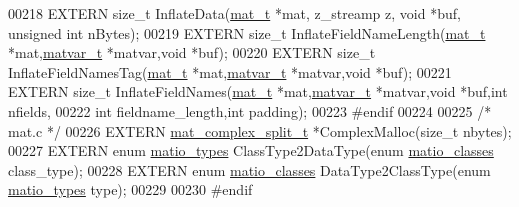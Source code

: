 \begin{DoxyCode}
00218 EXTERN \textcolor{keywordtype}{size\_t} InflateData(\hyperlink{struct__mat__t}{mat\_t} *mat, z\_streamp z, \textcolor{keywordtype}{void} *buf, \textcolor{keywordtype}{unsigned} \textcolor{keywordtype}{int} nBytes);
00219 EXTERN \textcolor{keywordtype}{size\_t} InflateFieldNameLength(\hyperlink{struct__mat__t}{mat\_t} *mat,\hyperlink{group___m_a_t_structmatvar__t}{matvar\_t} *matvar,\textcolor{keywordtype}{void} *buf);
00220 EXTERN \textcolor{keywordtype}{size\_t} InflateFieldNamesTag(\hyperlink{struct__mat__t}{mat\_t} *mat,\hyperlink{group___m_a_t_structmatvar__t}{matvar\_t} *matvar,\textcolor{keywordtype}{void} *buf);
00221 EXTERN \textcolor{keywordtype}{size\_t} InflateFieldNames(\hyperlink{struct__mat__t}{mat\_t} *mat,\hyperlink{group___m_a_t_structmatvar__t}{matvar\_t} *matvar,\textcolor{keywordtype}{void} *buf,\textcolor{keywordtype}{int} nfields,
00222                \textcolor{keywordtype}{int} fieldname\_length,\textcolor{keywordtype}{int} padding);
00223 \textcolor{preprocessor}{#endif}
00224 
00225 \textcolor{comment}{/* mat.c */}
00226 EXTERN \hyperlink{group___m_a_t_structmat__complex__split__t}{mat\_complex\_split\_t} *ComplexMalloc(\textcolor{keywordtype}{size\_t} nbytes);
00227 EXTERN \textcolor{keyword}{enum} \hyperlink{group___m_a_t_gacf7b3b879282b7ab3a51190e49bf3453}{matio\_types} ClassType2DataType(\textcolor{keyword}{enum} \hyperlink{group___m_a_t_gad4d60ae7b709fc81bfd744fb4c857c40}{matio\_classes} class\_type);
00228 EXTERN \textcolor{keyword}{enum} \hyperlink{group___m_a_t_gad4d60ae7b709fc81bfd744fb4c857c40}{matio\_classes} DataType2ClassType(\textcolor{keyword}{enum} \hyperlink{group___m_a_t_gacf7b3b879282b7ab3a51190e49bf3453}{matio\_types} type);
00229 
00230 \textcolor{preprocessor}{#endif}
\end{DoxyCode}
